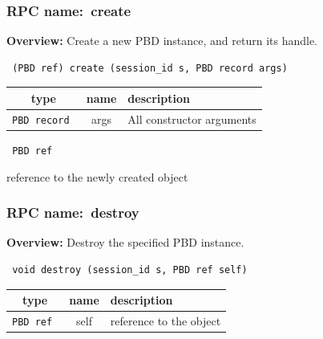 \subsubsection{RPC name:~create}

{\bf Overview:} 
Create a new PBD instance, and return its handle.

\begin{verbatim} (PBD ref) create (session_id s, PBD record args)\end{verbatim}



 
\vspace{0.3cm}
\begin{tabular}{|c|c|p{7cm}|}
 \hline
{\bf type} & {\bf name} & {\bf description} \\ \hline
{\tt PBD record } & args & All constructor arguments \\ \hline 

\end{tabular}

\vspace{0.3cm}

{\tt 
PBD ref
}


reference to the newly created object
\vspace{0.3cm}
\vspace{0.3cm}
\vspace{0.3cm}
\subsubsection{RPC name:~destroy}

{\bf Overview:} 
Destroy the specified PBD instance.

\begin{verbatim} void destroy (session_id s, PBD ref self)\end{verbatim}



 
\vspace{0.3cm}
\begin{tabular}{|c|c|p{7cm}|}
 \hline
{\bf type} & {\bf name} & {\bf description} \\ \hline
{\tt PBD ref } & self & reference to the object \\ \hline 

\end{tabular}

\vspace{0.3cm}

